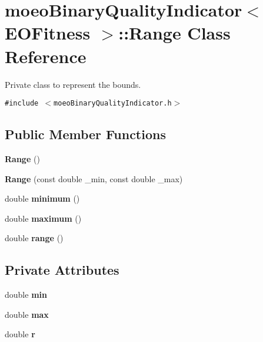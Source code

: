 \section{moeo\-Binary\-Quality\-Indicator$<$ EOFitness $>$::Range Class Reference}
\label{classmoeoBinaryQualityIndicator_1_1Range}
Private class to represent the bounds.  


{\tt \#include $<$moeo\-Binary\-Quality\-Indicator.h$>$}

\subsection*{Public Member Functions}
\begin{CompactItemize}
\item 
{\bf Range} ()\label{classmoeoBinaryQualityIndicator_1_1Range_6eafdd50d706e4add50a39400589697c}

\item 
{\bf Range} (const double \_\-min, const double \_\-max)\label{classmoeoBinaryQualityIndicator_1_1Range_1b739913f7b39b9332a85ba95bf0fd97}

\item 
double {\bf minimum} ()\label{classmoeoBinaryQualityIndicator_1_1Range_5e2d18b883faf80b5e8922508c1faeb7}

\item 
double {\bf maximum} ()\label{classmoeoBinaryQualityIndicator_1_1Range_82b2fdf7e8310b6b71230f75b298b455}

\item 
double {\bf range} ()\label{classmoeoBinaryQualityIndicator_1_1Range_352358206bff2de122504f2b1e0fc66f}

\end{CompactItemize}
\subsection*{Private Attributes}
\begin{CompactItemize}
\item 
double {\bf min}\label{classmoeoBinaryQualityIndicator_1_1Range_19ded3674f2ced2fe56a247e43cdc276}

\item 
double {\bf max}\label{classmoeoBinaryQualityIndicator_1_1Range_47728b83ab11c42c7dec8a0d31bf0f2b}

\item 
double {\bf r}\label{classmoeoBinaryQualityIndicator_1_1Range_fc0f543dc51a29059e25d3d0298bc08c}

\end{CompactItemize}


